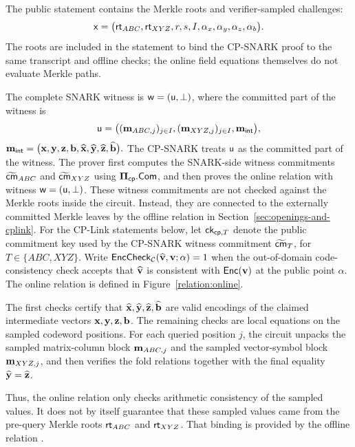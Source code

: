 The public statement contains the Merkle roots and verifier-sampled
challenges:
\[
\mathsf{x} = \big( \textsf{rt}_{ABC},\textsf{rt}_{XYZ},r, s, I,\alpha_x,\alpha_y,\alpha_z, \alpha_b
  \big).
\]
The roots are included in the statement to bind the CP-SNARK proof to the same
transcript and offline checks; the online field equations themselves do not
evaluate Merkle paths.

The complete SNARK witness is
  $\mathsf{w}=(\mathsf{u},\bot)$,
where the committed part of the witness is
\[
\mathsf{u} = \big( (\mathbf{m}_{ABC,j})_{j\in I},(\mathbf{m}_{XYZ,j})_{j\in I},\mathbf m_{\mathsf{int}} \big),
\]
  $\mathbf m_{\mathsf{int}}
  =
  \big(
    \mathbf{x},\mathbf{y},\mathbf{z},\mathbf{b},
    \widehat{\mathbf{x}},\widehat{\mathbf{y}},\widehat{\mathbf{z}}, \widehat{\mathbf{b}}
  \big).$
The CP-SNARK treats \(\mathsf{u}\) as the committed part of the witness.  The
prover first computes the SNARK-side witness commitments
\(\widetilde{\textsf{cm}}_{ABC}\) and \(\widetilde{\textsf{cm}}_{XYZ}\) using
\({\bf \Pi}_{{\mathsf{cp}}}.{\sf Com}\), and then proves the online relation with witness
\(\mathsf{w}=(\mathsf{u},\bot)\).  These witness commitments are not checked against
the Merkle roots inside the circuit.  Instead, they are connected to the
externally committed Merkle leaves by the offline relation in
Section~\ref{sec:openings-and-cplink}.
For the CP-Link statements below, let \({\textsf{ck}}_{{\mathsf{cp}},T}\) denote the public
commitment key used by the CP-SNARK witness commitment
\(\widetilde{\textsf{cm}}_{T}\), for \(T\in\{ABC,XYZ\}\).
Write
  $\mathsf{EncCheck}_{\mathcal{C}}(\widehat{\mathbf{v}},\mathbf{v};\alpha)=1$
when the out-of-domain code-consistency check accepts that
\(\widehat{\mathbf{v}}\) is consistent with \(\mathsf{Enc}(\mathbf{v})\) at the public
point \(\alpha\).  The online relation is defined in
Figure~\ref{relation:online}.


The first  checks certify that
\(\widehat{\mathbf{x}},\widehat{\mathbf{y}},\widehat{\mathbf{z}}, \widehat{\mathbf{b}}\) are valid
encodings of the claimed intermediate vectors
\(\mathbf{x},\mathbf{y},\mathbf{z}, \mathbf{b}\).  The remaining checks are local equations on the
sampled codeword positions.  For each queried position \(j\), the circuit
unpacks the sampled matrix-column block \(\mathbf{m}_{ABC,j}\) and the sampled
vector-symbol block \(\mathbf{m}_{XYZ,j}\), and then verifies the  fold
relations together with the final equality
\(\widehat{\mathbf{y}}=\widehat{\mathbf{z}}\).

Thus, the online relation only checks arithmetic consistency of the sampled
values.  It does not by itself guarantee that these sampled values came from
the pre-query Merkle roots \(\textsf{rt}_{ABC}\) and \(\textsf{rt}_{XYZ}\).  That binding is
provided by the offline relation .




